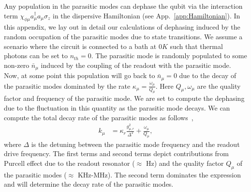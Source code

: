 \documentclass[prx,showpacs,notitlepage,twocolumn,superscriptaddress,nofootinbib,preprintnumbers,floatfix]{revtex4-2}
\begin{document}
Any population in the parasitic modes can dephase the qubit via the interaction term $\chi_{\phi\mu}a_\mu^\dagger a_\mu\sigma_z $ in the dispersive Hamiltonian (see App.~\ref{app:Hamiltonian}). In this appendix, we lay out in detail our calculations of dephasing induced by the random occupation of the parasitic modes due to state transitions. We assume a scenario where the circuit is connected to a bath at $0K$ such that thermal photons can be set to $n_{th}=0$. The parasitic mode is randomly populated to some non-zero $\bar n_\mu$ induced by the coupling of the readout with the parasitic mode. Now, at some point this population will go back to $\bar n_\mu=0$ due to the decay of the parasitic modes dominated by the rate $\kappa_\mu=\frac{\omega_\mu}{Q_\mu}$. Here $Q_\mu,\omega_\mu$ are the quality factor and frequency of the parasitic mode. We are set to compute the dephasing due to the fluctuation in this quantity as the parasitic mode decays. We can compute the total decay rate of the parasitic modes as follows~\cite{gambetta2006qubit}, 
\begin{align}
k_\mu&=\kappa_r \frac{g_{\mu,r}^2}{\Delta^2}+\frac{\omega_\mu}{Q_\mu},
\end{align}
where $\Delta$ is the detuning between the parasitic mode frequency and the readout drive frequency. The first terms and second terms depict contributions from Purcell effect due to the readout resonator ($\approx$ Hz) and the quality factor $Q_\mu$ of the parasitic modes ($\approx$ KHz-MHz). The second term dominates the expression and will determine the decay rate of the parasitic modes. 
 
\end{document}
